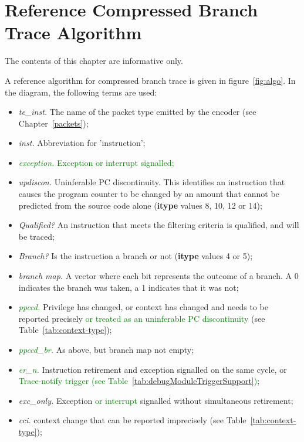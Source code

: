 \chapter{Reference Compressed Branch Trace Algorithm} \label{Algorithm}

The contents of this chapter are informative only.

A reference algorithm for compressed branch trace is given in figure~\ref{fig:algo}.  
In the diagram, the following terms are used:

\begin{itemize}
  \item \textit{te\_inst.} The name of the packet type emitted by the encoder (see Chapter~\ref{packets});
  \item \textit{inst.}  Abbreviation for 'instruction';
  \item \textcolor{green}{\textit{exception.}  Exception or interrupt signalled;}
  \item \textit{updiscon.}  Uninferable PC discontinuity.  This identifies an instruction that
    causes the program counter to be changed by an amount that cannot be predicted from the
    source code alone (\textbf{itype} values 8, 10, 12 or 14);
  \item \textit{Qualified?}  An instruction that meets the filtering criteria is qualified, and will be traced;
  \item \textit{Branch?} Is the instruction a branch or not (\textbf{itype} values 4 or 5);
  \item \textit{branch map.}  A vector where each bit represents the outcome of a branch.  A 0 indicates the
    branch was taken, a 1 indicates that it was not;
  \item \textcolor{green}{\textit{ppccd.}} Privilege has changed, or context has changed and needs to be 
    reported precisely \textcolor{green}{or treated as an uninferable PC discontinuity} (see Table~\ref{tab:context-type});
  \item \textcolor{green}{\textit{ppccd\_br.}} As above, but branch map not empty;
  \item \textcolor{green}{\textit{er\_n.}}  Instruction retirement and exception signalled on the same cycle, or
    \textcolor{green}{Trace-notify trigger (see Table~\ref{tab:debugModuleTriggerSupport})};
  \item \textit{exc\_only.}  Exception \textcolor{green}{or interrupt} signalled without simultaneous retirement;
  \item \textit{cci.}  context change that can be reported imprecisely (see Table~\ref{tab:context-type});

\end{itemize}
